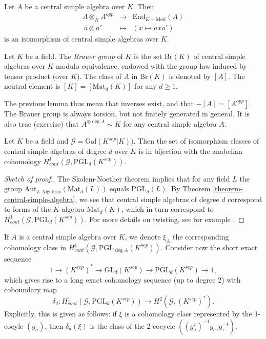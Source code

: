 \begin{lemma}
\label{lemma-brauer-inverse}
Let $A$ be a central simple algebra over $K$. Then
$$
\begin{matrix}
A \otimes_K A^{opp} & \longrightarrow & \text{End}_{K-\text{Mod}}(A) \\
\ a \otimes a' & \longmapsto & (x \mapsto a x a')
\end{matrix}
$$
is an isomorphism of central simple algebras over $K$.
\end{lemma}

\begin{definition}
\label{definition-brauer-group}
Let $K$ be a field. The {\it Brauer group} of $K$ is the set $\text{Br} (K)$
of central simple algebras over $K$ modulo equivalence, endowed with the group
law induced by tensor product (over $K$). The class of $A$ in $\text{Br} (K)$
is denoted by $[A]$. The neutral element is $[K] = [\text{Mat}_d(K)]$ for any
$d \geq 1$.
\end{definition}

\noindent
The previous lemma thus mean that inverses exist, and that $-[A] = [A^{opp}]$.
The Brauer group is always torsion, but not finitely generated in general. It
is also true (exercise) that $A^{\otimes \deg A} \sim K$ for any central simple
algebra $A$.

\begin{lemma}
\label{lemma-central-simple-algebra-pgln}
Let $K$ be a field and $\mathcal{G} = \text{Gal} (K^{sep}|K))$. Then the set of
isomorphism classes of central simple algebras of degree $d$ over $K$ is in
bijection with the anabelian cohomology $H_{cont}^1 (\mathcal{G},
\text{PGL}_d(K^{sep}))$.
\end{lemma}

\begin{proof}[Sketch of proof.]
The Skolem-Noether theorem implies that for any field $L$
the group
$\text{Aut}_{L\text{-Algebras}}(\text{Mat}_d(L))$
equals $\text{PGL}_d(L)$. By
Theorem \ref{theorem-central-simple-algebra}, we see that
central simple algebras of degree $d$ correspond
to forms of the $K$-algebra $\text{Mat}_d(K)$, which in turn correspond to
$H_{cont}^1 (\mathcal{G}, \text{PGL}_d(K^{sep}))$. For more details on
twisting, see for example
\cite{SilvermanEllipticCurves}.
\end{proof}

\noindent
If $A$ is a central simple algebra over $K$, we denote $\xi_A$ the
corresponding cohomology class in $H_{cont}^1 (\mathcal{G}, \text{PGL}_{\deg
A}(K^{sep}))$. Consider now the short exact sequence
$$
1 \to (K^{sep})^* \to \text{GL}_d(K^{sep}) \to \text{PGL}_d(K^{sep}) \to 1,
$$
which gives rise to a long exact cohomology sequence (up to degree 2) with
coboundary map
$$
\delta_d : H_{cont} ^1(\mathcal{G}, \text{PGL}_d(K^{sep})) \to H^2
(\mathcal{G}, (K^{sep})^*).
$$
Explicitly, this is given as follows: if $\xi$ is a cohomology class
represented by the 1-cocyle $(g_\sigma)$, then $\delta_d(\xi)$ is the class of
the 2-cocycle $((g_\sigma^\tau)^{-1} g_{\sigma \tau} g_\tau^{-1})$.

